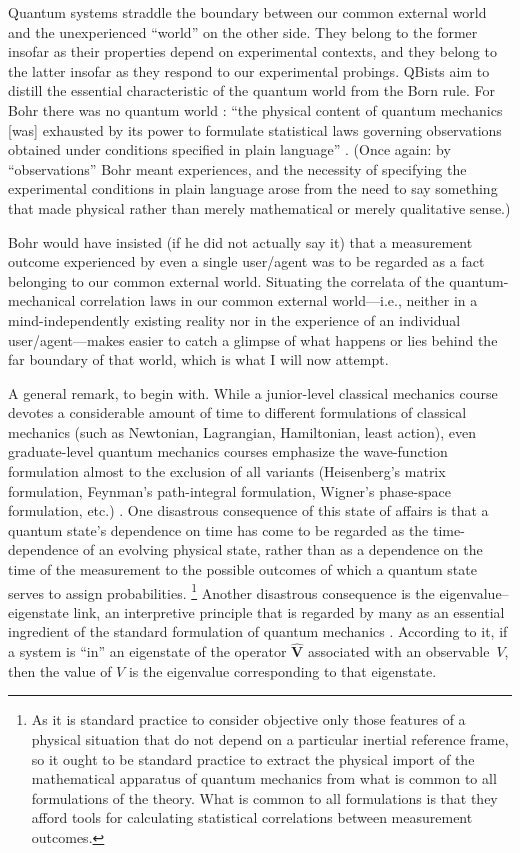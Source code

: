 \documentclass[12pt]{article}
\begin{document}
\noindent Quantum systems straddle the boundary between our common external world and the unexperienced ``world'' on the other side. They belong to the former insofar as their properties depend on experimental contexts, and they belong to the latter insofar as they respond to our experimental probings. QBists aim to distill the essential characteristic of the quantum world from the Born rule. For Bohr there was no quantum world \cite{Petersen1963}: ``the physical content of quantum mechanics [was] exhausted by its power to formulate statistical laws governing observations obtained under conditions specified in plain language'' \cite{Bohr-EAPHKp12}. (Once again: by ``observations'' Bohr meant experiences, and the necessity of specifying the experimental conditions in plain language arose from the need to say something that made physical rather than merely mathematical or merely qualitative sense.)

Bohr would have insisted (if he did not actually say it) that a measurement outcome experienced by even a single user/agent was to be regarded as a fact belonging to our common external world. Situating the correlata of the quantum-mechanical correlation laws in our common external world---i.e., neither in a mind-independently existing reality nor in the experience of an individual user/agent---makes easier to catch a glimpse of what happens or lies behind the far boundary of that world, which is what I will now attempt.

A general remark, to begin with. While a junior-level classical mechanics course devotes a considerable amount of time to different formulations of classical mechanics (such as Newtonian, Lagrangian, Hamiltonian, least action), even graduate-level quantum mechanics courses emphasize the wave-function formulation almost to the exclusion of all variants (Heisenberg's matrix formulation, Feynman's path-integral formulation, Wigner's phase-space formulation, etc.) \cite{Styeretal}. One disastrous consequence of this state of affairs is that a quantum state's dependence on time has come to be regarded as the time-dependence of an evolving physical state, rather than as a dependence on the time of the measurement to the possible outcomes of which a quantum state serves to assign probabilities.%
\footnote{As it is standard practice to consider objective only those features of a physical situation that do not depend on a particular inertial reference frame, so it ought to be standard practice to extract the physical import of the mathematical apparatus of quantum mechanics from what is common to all formulations of the theory. What is common to all formulations is that they afford tools for calculating statistical correlations between measurement outcomes.}
Another disastrous consequence is the eigenvalue--eigenstate link, an {interpretive principle} that is regarded by many as an essential ingredient of the standard formulation of quantum mechanics \cite{Gilton2016}.  According to it, if a system is ``in'' an eigenstate of the operator $\mathbf{\hat V}$ associated with an observable~$V$, then the value of $V$ is the eigenvalue corresponding to that eigenstate.
\end{document}
